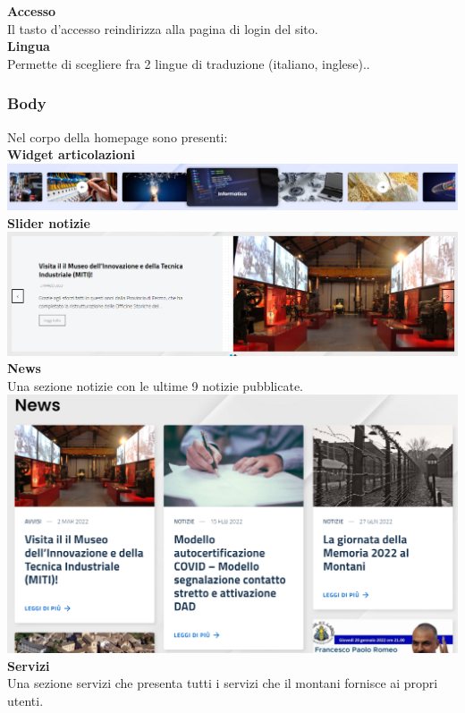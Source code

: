 \documentclass{article}
\begin{document}
	\textbf{Accesso}\\
	Il tasto d’accesso reindirizza alla pagina di login del sito.\\
	\textbf{Lingua}\\
	Permette di scegliere fra 2 lingue di traduzione (italiano, inglese)..\\
	\clearpage
	\subsubsection{\textbf{Body}}
	Nel corpo della homepage sono presenti:\\
	\textbf{Widget articolazioni}\\
	\includegraphics[scale=0.2]{indirizzi.jpeg}\\
	\textbf{Slider notizie}\\
	\includegraphics[scale=0.34]{news}\\
	\textbf{News}\\
	Una sezione notizie con le ultime 9 notizie pubblicate.
	\includegraphics[scale=0.4]{news2}\\
	\textbf{Servizi}\\
	Una sezione servizi che presenta tutti i servizi che il montani fornisce ai propri utenti.\\
\end{document}
